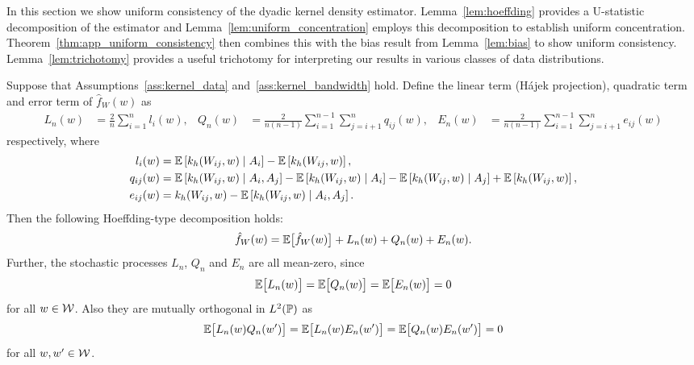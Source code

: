 In this section we show uniform consistency of the
dyadic kernel density estimator.
Lemma~\ref{lem:hoeffding}
provides a U-statistic decomposition of the estimator
and Lemma~\ref{lem:uniform_concentration}
employs this decomposition to establish
uniform concentration.
Theorem~\ref{thm:app_uniform_consistency}
then combines this with the bias result from Lemma~\ref{lem:bias}
to show uniform consistency.
Lemma~\ref{lem:trichotomy} provides a useful trichotomy for
interpreting our results in various classes of data distributions.

\begin{lemma}
  \label{lem:hoeffding}

  Suppose that Assumptions~\ref{ass:kernel_data}
  and~\ref{ass:kernel_bandwidth}
  hold.
  Define the linear term
  (H\'{a}jek projection),
  quadratic term
  and error term
  of $\hat f_W(w)$ as
  \begin{align*}
    L_n(w)
    &=
    \frac{2}{n} \sum_{i=1}^n
    l_i(w),
    &Q_n(w)
    &=
    \frac{2}{n(n-1)}
    \sum_{i=1}^{n-1}
    \sum_{j=i+1}^{n}
    q_{ij}(w),
    &E_n(w)
    &=
    \frac{2}{n(n-1)}
    \sum_{i=1}^{n-1}
    \sum_{j=i+1}^{n}
    e_{ij}(w)
  \end{align*}
  respectively, where
  \begin{align*}
    l_i(w)
    &=
    \E\left[k_h(W_{ij},w) \mid A_i\right] - \E\left[k_h(W_{ij},w)\right], \\
    q_{ij}(w)
    &=
    \E\left[k_h(W_{ij},w) \mid A_i, A_j\right]
    - \E\left[k_h(W_{ij},w) \mid A_i\right]
    - \E\left[k_h(W_{ij},w) \mid A_j\right]
    + \E\left[k_h(W_{ij},w)\right], \\
    e_{ij}(w)
    &=
    k_h(W_{ij},w)
    - \E\left[k_h(W_{ij},w) \mid A_i, A_j\right].
  \end{align*}
  Then the following Hoeffding-type decomposition holds:
  \begin{align*}
    \hat f_W(w)
    = \E\big[\hat f_W(w)\big]
    + L_n(w)
    + Q_n(w)
    + E_n(w).
  \end{align*}
  Further,
  the stochastic processes
  $L_n$, $Q_n$ and $E_n$
  are all mean-zero, since
  \begin{equation*}
    \E\big[L_n(w)\big]
    = \E\big[Q_n(w)\big]
    = \E\big[E_n(w)\big]
    = 0
  \end{equation*}
  for all $w \in \cW$.
  Also they are mutually orthogonal
  in $L^2(\P)$ as
  \begin{equation*}
    \E\big[
      L_n(w) Q_n(w')
      \big]
    = \E\big[
      L_n(w) E_n(w')
      \big]
    = \E\big[
      Q_n(w) E_n(w')
      \big]
    = 0
  \end{equation*}
  for all $w, w' \in \cW$.

\end{lemma}

